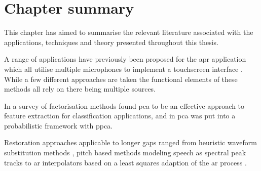 \section{Chapter summary}
This chapter has aimed to summarise the relevant literature associated with the applications, techniques and theory presented throughout this thesis.

A range of applications have previously been proposed for the \gls{apr} application which all utilise multiple microphones to implement a touchscreen interface \cite{US8174547}\linebreak[0]\cite{US8233353}\linebreak[0]\cite{TouchSystems2006}\cite{US7411581}\cite{WO2006108443}. While a few different approaches are taken the functional elements of these methods all rely on there being multiple sources.

In \cite{Burke2013} a survey of factorisation methods found \gls{pca} to be an effective approach to feature extraction for classification applications, and in \cite{Tipping1999} \gls{pca} was put into a probabilistic framework with \gls{ppca}.


Restoration approaches applicable to longer gaps ranged from heuristic waveform substitution methods \cite{Goodman1986}\cite{Niediwiecki2001}, pitch based methods modeling speech as spectral peak tracks \cite{Maher1994}\cite{McAulay1986} to \gls{ar} interpolators \cite{Esquef2006} based on a least squares adaption of the \gls{ar} process \cite{Godsill1998book}.








